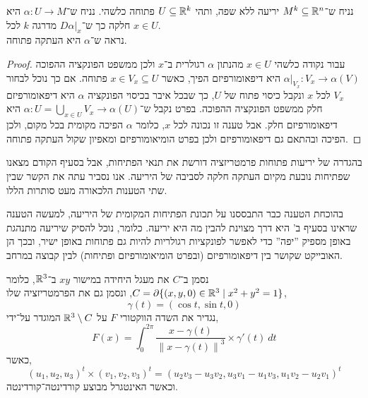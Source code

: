 \subquestion{}
נניח ש־$M^k \subseteq \mathbb{R}^n$ יריעה ללא שפה,
ותהי $U \subseteq \mathbb{R}^k$ פתוחה כלשהי.
נניח ש־$\alpha : U \to M$ היא חלקה כך ש־$D \alpha |_x$ מדרגה $k$ לכל $x \in U$. \\
נראה ש־$\alpha$ היא העתקה פתוחה.
\begin{proof}
	עבור נקודה כלשהי $x \in U$ מהנתון $\alpha$ רגולרית ב־$x$ ולכן ממשפט הפונקציה ההפוכה $\alpha |_{V_x} : V_x \to \alpha(V)$ היא דיפאומורפיזם הפיך, כאשר $x \in V_x \subseteq U$ פתוחה.
	אם כך נוכל לבחור $V_x$ לכל $x$ ונקבל כיסוי פתוח של $U$, כך שבכל איבר בכיסוי הפונקציה $\alpha$ היא דיפאומורפיזם חלק ממשפט הפונקציה ההפוכה.
	בפרט נקבל ש־$\alpha : U = \bigcup_{x \in U} V_x \to \alpha(U)$ היא דיפאומורפיזם חלק.
	אבל טענה זו נכונה לכל $x$, כלומר $\alpha$ הפיכה מקומית בכל מקום, ולכן הפיכה ובהתאם גם דיפאומורפיזם ולכן בפרט הומיאומורפיזם ומאפיון שקול העתקה פתוחה.
\end{proof}

\subquestion{}
בהגדרה של יריעות פתוחות פרמטריזציה דורשת את תנאי הפתיחות, אבל בסעיף הקודם מצאנו שפתיחות נובעת מקיום העתקה חלקה לסביבה של היריעה.
אנו נסביר עתה את הקשר שבין שתי הטענות הלכאורה מעט סותרות הללו.
\begin{solution}
	בהוכחת הטענה כבר התבססנו על תכונת הפתיחות המקומית של היריעה, למעשה הטענה שראינו בסעיף ב' היא דרך מצוינת להבין מה היא יריעה.
	כלומר, נוכל להסיק שיריעה מתנהגת באופן מספיק ''יפה'' כדי לאפשר לפונקציות רגולריות להיות גם פתוחות באופן ישיר, ובכך הן האובייקט שקושר בין דיפאומורפיזם (ובפרט הומיאומורפיזם ופתיחות) לבין קבוצה במרחב.
\end{solution}

\question{}
נסמן ב־$C$ את מעגל היחידה במישור $xy$ ב־$\mathbb{R}^3$, כלומר $C = \partial \{ (x, y, 0) \in \mathbb{R}^3 \mid x^2 + y^2 = 1 \}$,
ונסמן גם את הפרמטריזציה שלו,
\[
	\gamma(t)
	= (\cos t, \sin t, 0)
\]
נגדיר את השדה הווקטורי $F$ על $\mathbb{R}^3 \setminus C$ המוגדר על־ידי,
\[
	F(x)
	= \int_{0}^{2 \pi} \frac{x - \gamma(t)}{{\lVert x - \gamma(t) \rVert}^3} \times \gamma'(t)\ dt
\]
כאשר,
\[
	{(u_1, u_2, u_3)}^t \times {(v_1, v_2, v_3)}^t
	= {(u_2 v_3 - u_3 v_2, u_3 v_1 - u_1 v_3, u_1 v_2 - u_2 v_1)}^t
\]
וכאשר האינטגרל מבוצע קורדינטה־קורדינטה.

